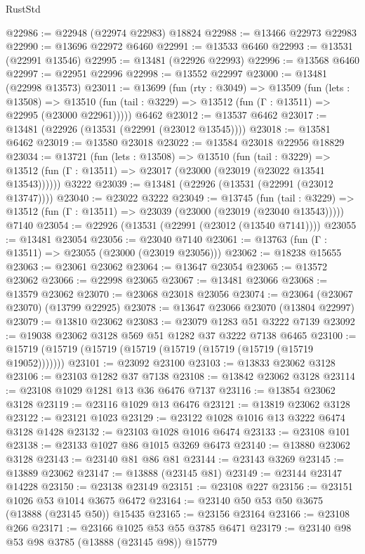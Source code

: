 \begin{lexlean}{RustStd}
\begin{coremodule}
@22986 := @22948 (@22974 @22983) @18824
@22988 := @13466 @22973 @22983
@22990 := @13696 @22972 @6460
@22991 := @13533 @6460
@22993 := @13531 (@22991 @13546)
@22995 := @13481 (@22926 @22993)
@22996 := @13568 @6460
@22997 := @22951 @22996
@22998 := @13552 @22997
@23000 := @13481 (@22998 @13573)
@23011 := @13699
    (fun (rty : @3049) =>
    @13509
      (fun (lets : @13508) =>
      @13510 (fun (tail : @3229) => @13512 (fun (Γ : @13511) => @22995 (@23000 @22961)))))
    @6462
@23012 := @13537 @6462
@23017 := @13481 (@22926 (@13531 (@22991 (@23012 @13545))))
@23018 := @13581 @6462
@23019 := @13580 @23018
@23022 := @13584 @23018 @22956 @18829
@23034 := @13721
    (fun (lets : @13508) =>
    @13510
      (fun (tail : @3229) =>
      @13512 (fun (Γ : @13511) => @23017 (@23000 (@23019 (@23022 @13541 @13543))))))
    @3222
@23039 := @13481 (@22926 (@13531 (@22991 (@23012 @13747))))
@23040 := @23022 @3222
@23049 := @13745
    (fun (tail : @3229) => @13512 (fun (Γ : @13511) => @23039 (@23000 (@23019 (@23040 @13543)))))
    @7140
@23054 := @22926 (@13531 (@22991 (@23012 (@13540 @7141))))
@23055 := @13481 @23054
@23056 := @23040 @7140
@23061 := @13763 (fun (Γ : @13511) => @23055 (@23000 (@23019 @23056)))
@23062 := @18238 @15655
@23063 := @23061 @23062
@23064 := @13647 @23054
@23065 := @13572 @23062
@23066 := @22998 @23065
@23067 := @13481 @23066
@23068 := @13579 @23062
@23070 := @23068 @23018 @23056
@23074 := @23064 (@23067 @23070) (@13799 @22925)
@23078 := @13647 @23066 @23070 (@13804 @22997)
@23079 := @13810 @23062
@23083 := @23079 @1283 @51 @3222 @7139
@23092 := @19038 @23062 @3128 @569 @51 @1282 @37 @3222 @7138 @6465
@23100 := @15719 (@15719 (@15719 (@15719 (@15719 (@15719 (@15719 (@15719 @19052)))))))
@23101 := @23092 @23100
@23103 := @13833 @23062 @3128
@23106 := @23103 @1282 @37 @7138
@23108 := @13842 @23062 @3128
@23114 := @23108 @1029 @1281 @13 @36 @6476 @7137
@23116 := @13854 @23062 @3128
@23119 := @23116 @1029 @13 @6476
@23121 := @13819 @23062 @3128
@23122 := @23121 @1023
@23129 := @23122 @1028 @1016 @13 @3222 @6474 @3128 @1428
@23132 := @23103 @1028 @1016 @6474
@23133 := @23108 @101
@23138 := @23133 @1027 @86 @1015 @3269 @6473
@23140 := @13880 @23062 @3128
@23143 := @23140 @81 @86 @81
@23144 := @23143 @3269
@23145 := @13889 @23062
@23147 := @13888 (@23145 @81)
@23149 := @23144 @23147 @14228
@23150 := @23138 @23149
@23151 := @23108 @227
@23156 := @23151 @1026 @53 @1014 @3675 @6472
@23164 := @23140 @50 @53 @50 @3675 (@13888 (@23145 @50)) @15435
@23165 := @23156 @23164
@23166 := @23108 @266
@23171 := @23166 @1025 @53 @55 @3785 @6471
@23179 := @23140 @98 @53 @98 @3785 (@13888 (@23145 @98)) @15779

\end{coremodule}
\end{lexlean}
